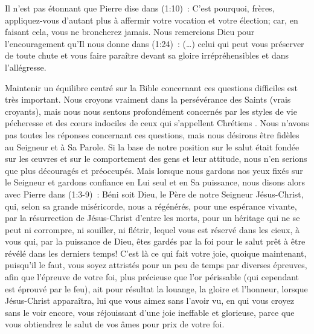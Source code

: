 \begin{enumerate}
Il n'est pas étonnant que Pierre dise dans (1:10)~:
 \og C'est pourquoi, frères, appliquez-vous d'autant plus à affermir
 votre vocation et votre élection;
 car, en faisant cela, vous ne broncherez jamais. \fg{}
Nous remercions Dieu pour l'encouragement qu'Il nous donne dans (1:24)~:
 \og (\dots{}) celui qui peut vous préserver de toute chute et vous faire paraître
 devant sa gloire irrépréhensibles et dans l'allégresse. \fg{}

Maintenir un équilibre centré sur la Bible concernant ces questions difficiles est très important.
 Nous croyons vraiment dans la persévérance des Saints (vrais croyants),
 mais nous nous sentons profondément concernés par les styles de vie pécheresse et des cœurs indociles
 de ceux qui s'appellent \og Chrétiens \fg{}.
 Nous n'avons pas toutes les réponses concernant ces questions,
 mais nous désirons être fidèles au Seigneur et à Sa Parole.
 Si la base de notre position sur le salut était fondée sur les œuvres
 et sur le comportement des gens et leur attitude,
 nous n'en serions que plus découragés et préoccupés.
 Mais lorsque nous gardons nos yeux fixés sur le Seigneur et gardons confiance en Lui seul
 et en Sa puissance, nous disons alors avec Pierre dans (1:3-9)~:
 \og Béni soit Dieu, le Père de notre Seigneur Jésus-Christ, qui, selon sa grande miséricorde,
 nous a régénérés, pour une espérance vivante, par la résurrection de Jésus-Christ d'entre les morts,
 pour un héritage qui ne se peut ni corrompre, ni souiller, ni flétrir,
 lequel vous est réservé dans les cieux, à vous qui, par la puissance de Dieu,
 êtes gardés par la foi pour le salut prêt à être révélé dans les derniers temps!
 C'est là ce qui fait votre joie, quoique maintenant, puisqu'il le faut,
 vous soyez attristés pour un peu de temps par diverses épreuves, afin que l'épreuve de votre foi,
 plus précieuse que l'or périssable (qui cependant est éprouvé par le feu),
 ait pour résultat la louange, la gloire et l'honneur, lorsque Jésus-Christ apparaîtra,
 lui que vous aimez sans l'avoir vu, en qui vous croyez sans le voir encore,
 vous réjouissant d'une joie ineffable et glorieuse,
 parce que vous obtiendrez le salut de vos âmes pour prix de votre foi. \fg{}


\end{enumerate}


